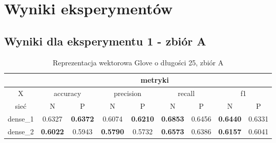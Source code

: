 \section{Wyniki eksperymentów}


\subsection{\label{wyniki_eksperymentow_eks_1}Wyniki dla eksperymentu 1 - zbiór A}


\begin{table}[hp] \centering
    \caption{Reprezentacja wektorowa Glove o długości 25, zbiór A}
    \label{tab:wyniki_glove_A}
    \begin{tabular} {|c|c|c|c|c|c|c|c|c| }    \hline
                 & \multicolumn{8}{c|}{metryki}                                                                                                                                                                                                                                                                                  \\ \hline
        X        & \multicolumn{2}{c|}{accuracy}       & \multicolumn{2}{c|}{precision}      & \multicolumn{2}{c|}{recall}         & \multicolumn{2}{c|}{f1}                                                                                                                                                                     \\ \hline
        sieć     & N                                   & P                                   & N                                   & P                                   & N                                   & P                                   & N                                   & P                                   \\ \hline
        dense\_1 & 0.6327                              & \textbf{0.6372}                     & 0.6074                              & \textbf{0.6210}                     & \textbf{0.6853}                     & 0.6456                              & \textbf{0.6440}                     & 0.6331                              \\ \hline
        dense\_2 & \textbf{0.6022}                     & 0.5943                              & \textbf{0.5790}                     & 0.5732                              & \textbf{0.6573}                     & 0.6386                              & \textbf{0.6157}                     & 0.6041                              \\ \hline

\end{tabular}
\end{table}
